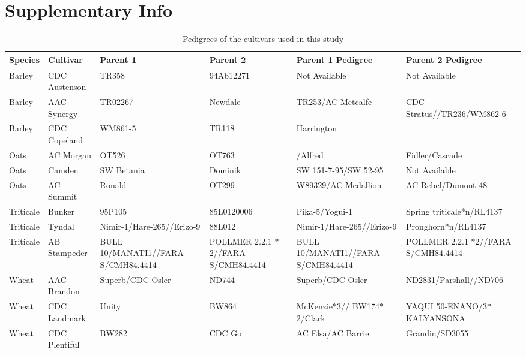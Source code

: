 \documentclass[12pt, letterpaper]{report}
\begin{document}
\section{Supplementary Info}
\begin{landscape}
\begin{table}
        \centering
        \caption{Pedigrees of the cultivars used in this study}
        \begin{tabular}{ll>{\raggedright\arraybackslash}p{3cm}>{\raggedright\arraybackslash}p{3cm}>{\raggedright\arraybackslash}p{5cm}>{\raggedright\arraybackslash}p{4cm}}
          \toprule
          Species & Cultivar & Parent 1 & Parent 2 & Parent 1 Pedigree & Parent 2 Pedigree \\
          \midrule
          Barley & CDC Austenson & TR358 & 94Ab12271 & Not Available & Not Available \\
          Barley & AAC Synergy & TR02267 & Newdale & TR253/AC Metcalfe & CDC Stratus//TR236/WM862-6 \\
          Barley & CDC Copeland & WM861-5 & TR118 & Harrington & \\
          Oats & AC Morgan & OT526 & OT763 & 17578/Alfred & Fidler/Cascade \\
          Oats & Camden & SW Betania & Dominik & SW 151-7-95/SW 52-95 & Not Available \\
          Oats & AC Summit & Ronald & OT299 & W89329/AC Medallion & AC Rebel/Dumont 48 \\
          Triticale & Bunker & 95P105 & 85L0120006 & Pika-5/Yogui-1 & Spring triticale*n/RL4137 \\
          Triticale & Tyndal & Nimir-1/Hare-265//Erizo-9 & 88L012 & Nimir-1/Hare-265//Erizo-9 & Pronghorn*n/RL4137 \\
          Triticale & AB Stampeder & BULL 10/MANATI1//FARA S/CMH84.4414 & POLLMER 2.2.1 $\ast$2//FARA S/CMH84.4414 & BULL 10/MANATI1//FARA S/CMH84.4414 & POLLMER 2.2.1 $\ast$2//FARA S/CMH84.4414 \\
          Wheat & AAC Brandon & Superb/CDC Osler & ND744 & Superb/CDC Osler & ND2831/Parshall//ND706 \\
          Wheat & CDC Landmark & Unity & BW864 & McKenzie$\ast$3// BW174$\ast$2/Clark & YAQUI 50-ENANO/3$\ast$KALYANSONA \\
          Wheat & CDC Plentiful & BW282 & CDC Go & AC Elsa/AC Barrie & Grandin/SD3055 \\
          \bottomrule
        \end{tabular}
      \end{table}
      
      \end{landscape}
\end{document}

